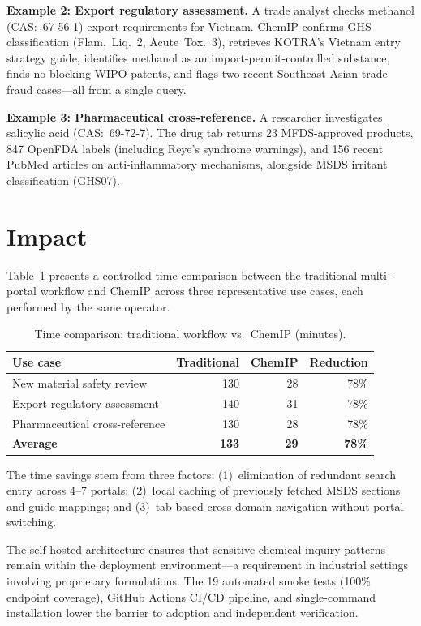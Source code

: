\documentclass[preprint,12pt]{elsarticle}
\begin{document}
\textbf{Example 2: Export regulatory assessment.}
A trade analyst checks methanol (CAS:~67-56-1) export requirements for Vietnam.
ChemIP confirms GHS classification (Flam.~Liq.~2, Acute~Tox.~3), retrieves KOTRA's Vietnam entry strategy guide, identifies methanol as an import-permit-controlled substance, finds no blocking WIPO patents, and flags two recent Southeast Asian trade fraud cases---all from a single query.

\textbf{Example 3: Pharmaceutical cross-reference.}
A researcher investigates salicylic acid (CAS:~69-72-7).
The drug tab returns 23 MFDS-approved products, 847 OpenFDA labels (including Reye's syndrome warnings), and 156 recent PubMed articles on anti-inflammatory mechanisms, alongside MSDS irritant classification (GHS07).

\section{Impact}
\label{sec:impact}

Table~\ref{tab:efficiency} presents a controlled time comparison between the traditional multi-portal workflow and ChemIP across three representative use cases, each performed by the same operator.

\begin{table}[H]
\centering
\caption{Time comparison: traditional workflow vs.\ ChemIP (minutes).}
\label{tab:efficiency}
\small
\begin{tabular}{@{}lrrr@{}}
\toprule
\textbf{Use case} & \textbf{Traditional} & \textbf{ChemIP} & \textbf{Reduction} \\
\midrule
New material safety review & 130 & 28 & 78\% \\
Export regulatory assessment & 140 & 31 & 78\% \\
Pharmaceutical cross-reference & 130 & 28 & 78\% \\
\midrule
\textbf{Average} & \textbf{133} & \textbf{29} & \textbf{78\%} \\
\bottomrule
\end{tabular}
\end{table}

The time savings stem from three factors: (1)~elimination of redundant search entry across 4--7 portals; (2)~local caching of previously fetched MSDS sections and guide mappings; and (3)~tab-based cross-domain navigation without portal switching.

The self-hosted architecture ensures that sensitive chemical inquiry patterns remain within the deployment environment---a requirement in industrial settings involving proprietary formulations.
The 19 automated smoke tests (100\% endpoint coverage), GitHub Actions CI/CD pipeline, and single-command installation lower the barrier to adoption and independent verification.
\end{document}
